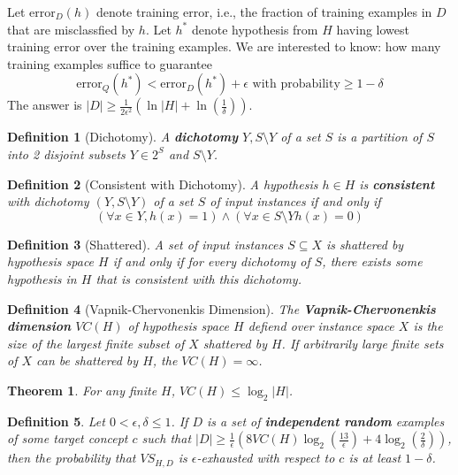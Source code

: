 \documentclass[12pt]{article}
\newtheorem{definition}{Definition}[section]
\newtheorem{theorem}{Theorem}[section]
\theoremstyle{definition}
\begin{document}
Let $\text{error}_D(h)$ denote training error, i.e., the fraction of training examples in $D$ that are misclassfied by $h$. Let $h^\ast$ denote hypothesis from $H$ having lowest training error over the training examples. We are interested to know: how many training examples suffice to guarantee
\[
\text{error}_Q(h^\ast)<\text{error}_D(h^\ast)+\epsilon\text{ with probability}\geq 1-\delta
\]
The answer is $|D|\geq \frac{1}{2\epsilon^2}(\ln |H| + \ln(\frac{1}{\delta}))$.
\begin{definition}[Dichotomy]
\normalfont A \textbf{dichotomy} $Y, S\setminus Y$ of a set $S$ is a partition of $S$ into 2 disjoint subsets $Y\in 2^S$ and $S\setminus Y$.
\end{definition}
\begin{definition}[Consistent with Dichotomy]
\normalfont A hypothesis $h\in H$ is \textbf{consistent} with dichotomy $(Y, S\setminus Y)$ of a set $S$ of input instances if and only if
\[
(\forall x\in Y,h(x)=1)\land (\forall x\in S\setminus Y h(x)=0)
\]
\end{definition}
\begin{definition}[Shattered]
\normalfont A set of input instances $S\subseteq X$ is shattered by hypothesis space $H$ \textit{if and only if} for \textit{every} dichotomy of $S$, there exists \textit{some hypothesis} in $H$ that is consistent with this dichotomy.
\end{definition}
\begin{definition}[Vapnik-Chervonenkis Dimension]
\normalfont The \textbf{Vapnik-Chervonenkis dimension} $VC(H)$ of hypothesis space $H$ defiend over instance space $X$ is the size of the largest finite subset of $X$ shattered by $H$. If arbitrarily large finite sets of $X$ can be shattered by $H$, the $VC(H)=\infty$.
\end{definition}
\begin{theorem}\normalfont For any finite $H$, $VC(H)\leq \log_2|H|$.\end{theorem}
\begin{definition}\normalfont Let $0<\epsilon, \delta\leq 1$. If $D$ is a set of \textbf{independent random} examples of some target concept $c$ such that $|D|\geq \frac{1}{\epsilon}(8VC(H)\log_2(\frac{13}{\epsilon})+4\log_2(\frac{2}{\delta}))$, then the probability that $VS_{H, D}$ is $\epsilon$-exhausted with respect to $c$ is at least $1-\delta$.
\end{definition}
\end{document}
